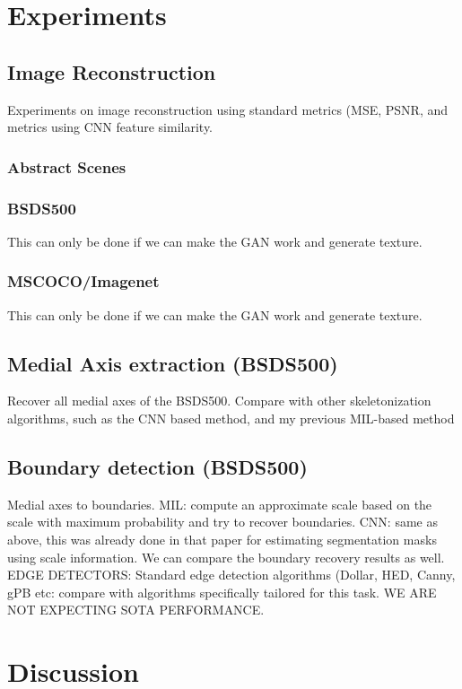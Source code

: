 \documentclass[10pt,twocolumn,letterpaper]{article}
\begin{document}
\section{Experiments}\label{sec:experiments}
\subsection{Image Reconstruction}
Experiments on image reconstruction using standard metrics (MSE, PSNR, and metrics using CNN feature similarity.

\subsubsection*{Abstract Scenes}
\subsubsection*{BSDS500}
This can only be done if we can make the GAN work and generate texture.
\subsubsection*{MSCOCO/Imagenet}
This can only be done if we can make the GAN work and generate texture.

\subsection{Medial Axis extraction (BSDS500)}
Recover all medial axes of the BSDS500. Compare with other skeletonization algorithms, such
as the CNN based method, and my previous MIL-based method

\subsection{Boundary detection (BSDS500)}
Medial axes to boundaries. 
MIL: compute an approximate scale based on the scale with maximum probability and try to recover boundaries.
CNN: same as above, this was already done in that paper for estimating segmentation masks using scale information.
We can compare the boundary recovery results as well.
EDGE DETECTORS: Standard edge detection algorithms (Dollar, HED, Canny, gPB etc: compare with algorithms specifically
tailored for this task. WE ARE NOT EXPECTING SOTA PERFORMANCE.

\section{Discussion}\label{sec:discussion}

{\small


}
\end{document}
